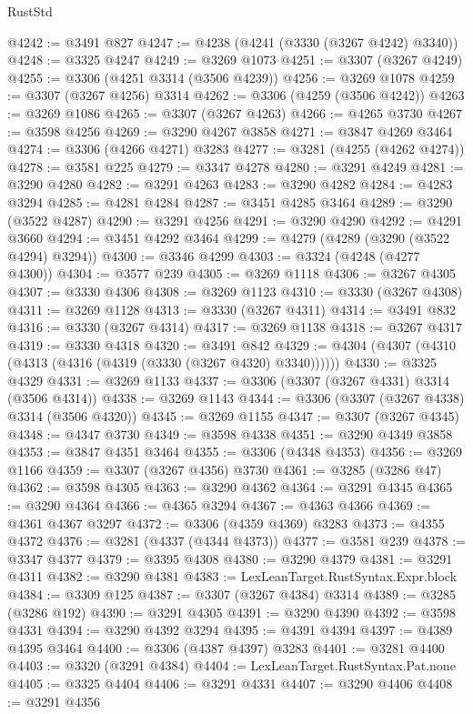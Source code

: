 \begin{lexlean}{RustStd}
\begin{coremodule}
@4242 := @3491 @827
@4247 := @4238 (@4241 (@3330 (@3267 @4242) @3340))
@4248 := @3325 @4247
@4249 := @3269 @1073
@4251 := @3307 (@3267 @4249)
@4255 := @3306 (@4251 @3314 (@3506 @4239))
@4256 := @3269 @1078
@4259 := @3307 (@3267 @4256) @3314
@4262 := @3306 (@4259 (@3506 @4242))
@4263 := @3269 @1086
@4265 := @3307 (@3267 @4263)
@4266 := @4265 @3730
@4267 := @3598 @4256
@4269 := @3290 @4267 @3858
@4271 := @3847 @4269 @3464
@4274 := @3306 (@4266 @4271) @3283
@4277 := @3281 (@4255 (@4262 @4274))
@4278 := @3581 @225
@4279 := @3347 @4278
@4280 := @3291 @4249
@4281 := @3290 @4280
@4282 := @3291 @4263
@4283 := @3290 @4282
@4284 := @4283 @3294
@4285 := @4281 @4284
@4287 := @3451 @4285 @3464
@4289 := @3290 (@3522 @4287)
@4290 := @3291 @4256
@4291 := @3290 @4290
@4292 := @4291 @3660
@4294 := @3451 @4292 @3464
@4299 := @4279 (@4289 (@3290 (@3522 @4294) @3294))
@4300 := @3346 @4299
@4303 := @3324 (@4248 (@4277 @4300))
@4304 := @3577 @239
@4305 := @3269 @1118
@4306 := @3267 @4305
@4307 := @3330 @4306
@4308 := @3269 @1123
@4310 := @3330 (@3267 @4308)
@4311 := @3269 @1128
@4313 := @3330 (@3267 @4311)
@4314 := @3491 @832
@4316 := @3330 (@3267 @4314)
@4317 := @3269 @1138
@4318 := @3267 @4317
@4319 := @3330 @4318
@4320 := @3491 @842
@4329 := @4304 (@4307 (@4310 (@4313 (@4316 (@4319 (@3330 (@3267 @4320) @3340))))))
@4330 := @3325 @4329
@4331 := @3269 @1133
@4337 := @3306 (@3307 (@3267 @4331) @3314 (@3506 @4314))
@4338 := @3269 @1143
@4344 := @3306 (@3307 (@3267 @4338) @3314 (@3506 @4320))
@4345 := @3269 @1155
@4347 := @3307 (@3267 @4345)
@4348 := @4347 @3730
@4349 := @3598 @4338
@4351 := @3290 @4349 @3858
@4353 := @3847 @4351 @3464
@4355 := @3306 (@4348 @4353)
@4356 := @3269 @1166
@4359 := @3307 (@3267 @4356) @3730
@4361 := @3285 (@3286 @47)
@4362 := @3598 @4305
@4363 := @3290 @4362
@4364 := @3291 @4345
@4365 := @3290 @4364
@4366 := @4365 @3294
@4367 := @4363 @4366
@4369 := @4361 @4367 @3297
@4372 := @3306 (@4359 @4369) @3283
@4373 := @4355 @4372
@4376 := @3281 (@4337 (@4344 @4373))
@4377 := @3581 @239
@4378 := @3347 @4377
@4379 := @3395 @4308
@4380 := @3290 @4379
@4381 := @3291 @4311
@4382 := @3290 @4381
@4383 := LexLeanTarget.RustSyntax.Expr.block
@4384 := @3309 @125
@4387 := @3307 (@3267 @4384) @3314
@4389 := @3285 (@3286 @192)
@4390 := @3291 @4305
@4391 := @3290 @4390
@4392 := @3598 @4331
@4394 := @3290 @4392 @3294
@4395 := @4391 @4394
@4397 := @4389 @4395 @3464
@4400 := @3306 (@4387 @4397) @3283
@4401 := @3281 @4400
@4403 := @3320 (@3291 @4384)
@4404 := LexLeanTarget.RustSyntax.Pat.none
@4405 := @3325 @4404
@4406 := @3291 @4331
@4407 := @3290 @4406
@4408 := @3291 @4356

\end{coremodule}
\end{lexlean}
